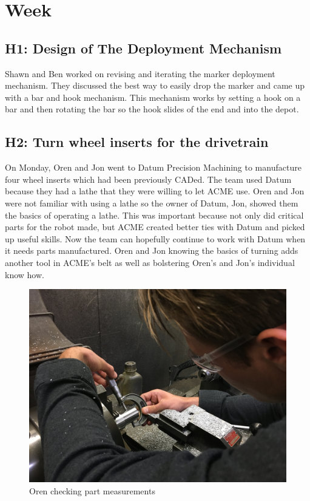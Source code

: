 \documentclass{article}
\begin{document}
\clearpage \newpage \section{Week \thesection} 
\subsection{H1: Design of The Deployment Mechanism}

Shawn and Ben worked on revising and iterating the marker deployment mechanism. They discussed the best way to easily drop the marker and came up with a bar and hook mechanism. This mechanism works by setting a hook on a bar and then rotating the bar so the hook slides of the end and into the depot.

\subsection{H2: Turn wheel inserts for the drivetrain}

On Monday, Oren and Jon went to Datum Precision Machining to manufacture four wheel inserts which had been previously CADed. The team used Datum because they had a lathe that they were willing to let ACME use. Oren and Jon were not familiar with using a lathe so the owner of Datum, Jon, showed them the basics of operating a lathe. This was important because not only did critical parts for the robot made, but ACME created better ties with Datum and picked up useful skills. Now the team can hopefully continue to work with Datum when it needs parts manufactured. Oren and Jon knowing the basics of turning adds another tool in ACME’s belt as well as bolstering Oren’s and Jon’s individual know how.

\begin{figure}
    \centering
    \includegraphics[width=.6 \textwidth]{08_10-22/images/IMG_0330.JPG}
    \caption{Oren checking part measurements}
    \label{fig: Turning Inserts}
\end{figure}
\end{document}
